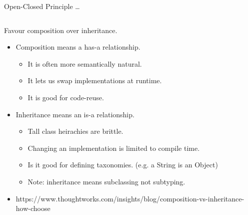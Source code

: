 \documentclass{beamer}
\begin{document}
\begin{frame}{Open-Closed Principle \ldots}
    \vspace{0cm}
    \begin{columns}
        \column{\dimexpr\paperwidth-40pt}
        
    \end{columns}
\end{frame}

\begin{frame}{Favour composition over inheritance.}
    \begin{itemize}
        \item Composition means a has-a relationship.
            \begin{itemize}
                \item It is often more semantically natural.
                \item It lets us swap implementations at runtime.
                \item It is good for code-reuse.
            \end{itemize}
        \item Inheritance means an is-a relationship.
            \begin{itemize}
                \item Tall class heirachies are brittle.
                \item Changing an implementation is limited to compile time.
                \item Is it good for defining taxonomies. (e.g. a String is an Object)
                \item Note: inheritance means subclassing not subtyping.
            \end{itemize}
        \item https://www.thoughtworks.com/insights/blog/composition-vs-inheritance-how-choose
    \end{itemize}
\end{frame}
\end{document}
